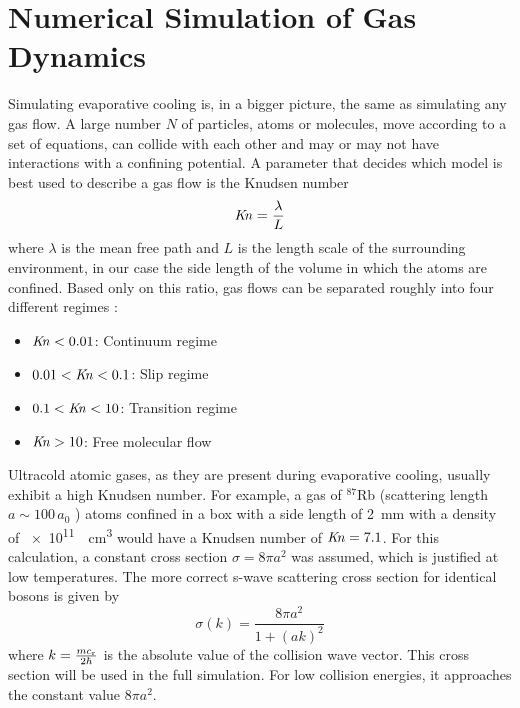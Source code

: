 \section{Numerical Simulation of Gas Dynamics}

Simulating evaporative cooling is, in a bigger picture, the same as simulating any gas flow. A large number $N$ of particles, atoms or molecules, move according to a set of equations, can collide with each other and may or may not have interactions with a confining potential. A parameter that decides which model is best used to describe a gas flow is the Knudsen number \Kn
\begin{equation*}
    \mathit{K\kern-0.21em n} = \frac{\lambda}{L}
\end{equation*}
where $\lambda$ is the mean free path and $L$ is the length scale of the surrounding environment, in our case the side length of the volume in which the atoms are confined. Based only on this ratio, gas flows can be separated roughly into four different regimes \cite{schaaf:1958}:
\begin{itemize}
    \item $\mathit{K\kern-0.21em n} < \num{.01}$: Continuum regime
    \item $\num{.01} < \mathit{K\kern-0.21em n} < \num{.1}$: Slip regime
    \item $\num{.1} < \mathit{K\kern-0.21em n} < \num{10}$: Transition regime
    \item $\mathit{K\kern-0.21em n} > 10$: Free molecular flow
\end{itemize}

Ultracold atomic gases, as they are present during evaporative cooling, usually exhibit a high Knudsen number. For example, a gas of $^{87}$Rb (scattering length $a\sim 100\, a_0$ \cite{PhysRevA.87.053614}) atoms confined in a box with a side length of \SI{2}{mm} with a density of \SI{e11}{\per\centi\meter\cubed} would have a Knudsen number of $\mathit{K\kern-0.21em n} = \num{7.1}$. For this calculation, a constant cross section $\sigma = 8\pi a^2$ was assumed, which is justified at low temperatures. The more correct s-wave scattering cross section for identical bosons is given by \cite{dalibardCollision}
\begin{equation}  \label{eq:crosssection}
    \sigma(k) = \frac{8\pi a^2}{1 + (ak)^2} 
\end{equation}
where $k=\frac{mc_\text{r}}{2\hbar}$ is the absolute value of the collision wave vector. This cross section will be used in the full simulation. For low collision energies, it approaches the constant value $8\pi a^2$.

